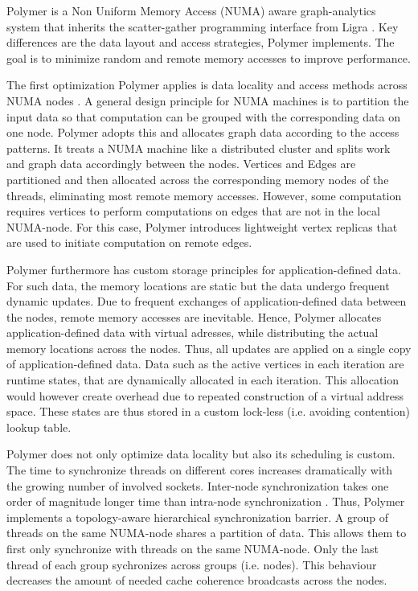 
Polymer is a Non Uniform Memory Access (NUMA) aware graph-analytics system that inherits the scatter-gather programming interface from Ligra \cite{Ligra}.
Key differences are the data layout and access strategies, Polymer implements.
The goal is to minimize random and remote memory accesses to improve performance.

The first optimization Polymer applies is data locality and access methods across NUMA nodes \cite{Polymer}.
A general design principle for NUMA machines is to partition the input data so that computation can be grouped with the corresponding data on one node.
Polymer adopts this and allocates graph data according to the access patterns.
It treats a NUMA machine like a distributed cluster and splits work and graph data accordingly between the nodes.
Vertices and Edges are partitioned and then allocated across the corresponding memory nodes of the threads, eliminating most remote memory accesses.
However, some computation requires vertices to perform computations on edges that are not in the local NUMA-node.
For this case, Polymer introduces lightweight vertex replicas that are used to initiate computation on remote edges.

Polymer furthermore has custom storage principles for application-defined data.
For such data, the memory locations are static but the data undergo frequent dynamic updates. Due to frequent exchanges of application-defined data between the nodes, remote memory accesses are inevitable.
Hence, Polymer allocates application-defined data with virtual adresses, while distributing the actual memory locations across the nodes. Thus, all updates are applied on a single copy of application-defined data.
Data such as the active vertices in each iteration are runtime states, that are dynamically allocated in each iteration. This allocation would however create overhead due to repeated construction of a virtual address space.
These states are thus stored in a custom lock-less (i.e. avoiding contention) lookup table.

Polymer does not only optimize data locality but also its scheduling is custom.
The time to synchronize threads on different cores increases dramatically with the growing number of involved sockets. Inter-node synchronization takes one order of magnitude longer time than intra-node synchronization \cite{Polymer}.
Thus, Polymer implements a topology-aware hierarchical synchronization barrier.
A group of threads on the same NUMA-node shares a partition of data. This allows them to first only synchronize with threads on the same NUMA-node. Only the last thread of each group sychronizes across groups (i.e. nodes). This behaviour decreases the amount of needed cache coherence broadcasts across the nodes.

